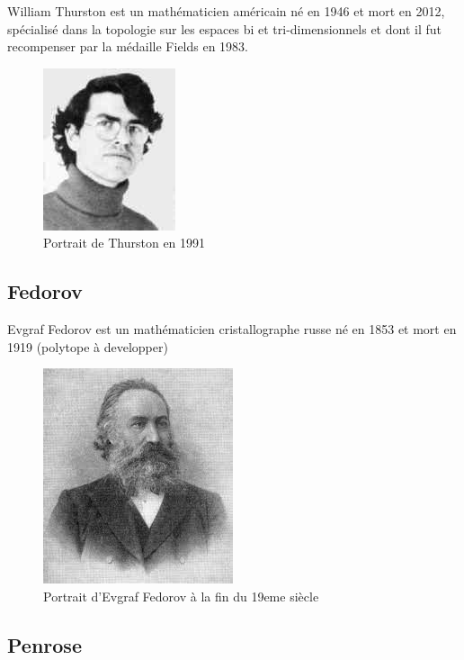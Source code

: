 \documentclass{article}
\begin{document}
\label{Thurston}

William Thurston est un mathématicien américain né en 1946 et mort en 2012, spécialisé dans la topologie sur les espaces bi et tri-dimensionnels et dont il fut recompenser par la médaille Fields en 1983.

\begin{figure} [!h]
    \center
    \includegraphics [scale=0.5] {image/thurston.jpg}
    \caption{Portrait de Thurston en 1991}
\end{figure}

\newpage

\subsection{Fedorov}

\label{Fedorov}

Evgraf Fedorov est un mathématicien cristallographe russe né en 1853 et mort en 1919 (polytope à developper)

\begin{figure} [!h]
    \center
    \includegraphics [scale=0.5] {image/Fedorov.jpg}
    \caption{Portrait d'Evgraf Fedorov à la fin du 19eme siècle}
\end{figure}

\newpage

\subsection{Penrose}
\end{document}
